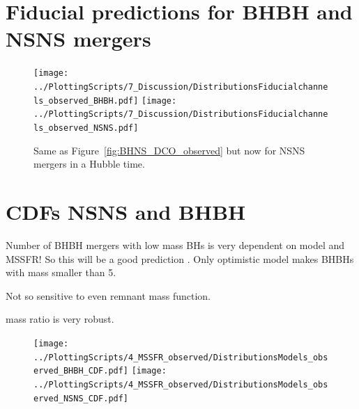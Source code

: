 \documentclass[twocolumn]{aastex63}
\begin{document}
\section{Fiducial predictions for BHBH and NSNS mergers}
\label{sec:app-fiducial-GW-predictions-for-BBH-BNS}





\begin{figure}
   \texttt{[image: ../PlottingScripts/7\_Discussion/DistributionsFiducialchannels\_observed\_BHBH.pdf]}
\texttt{[image: ../PlottingScripts/7\_Discussion/DistributionsFiducialchannels\_observed\_NSNS.pdf]}
      \caption{ Same as Figure~\ref{fig:BHNS_DCO_observed} but now for NSNS mergers in a Hubble time. }
  \label{fig:BHNS_DCO_observed_BNS}
\end{figure}
%

\section{CDFs NSNS and BHBH}
\label{sec:app-BHBHandNSNS_CDF}


Number of BHBH mergers with low mass BHs is very dependent on model and MSSFR! So this will be a good prediction . 
Only optimistic model makes BHBHs with mass smaller than 5. 

Not so sensitive to even remnant mass function. 

mass ratio is very robust. 




%
\begin{figure}
\label{fig:CDFs_BHNS_observed}
    \centering
\texttt{[image: ../PlottingScripts/4\_MSSFR\_observed/DistributionsModels\_observed\_BHBH\_CDF.pdf]} %
\texttt{[image: ../PlottingScripts/4\_MSSFR\_observed/DistributionsModels\_observed\_NSNS\_CDF.pdf]}
    \caption{}%
\end{figure}
%


%
\end{document}
